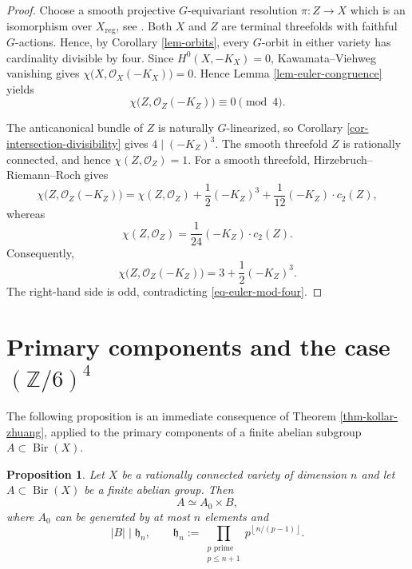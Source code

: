 \documentclass[10pt,oneside,reqno]{amsart}
\numberwithin{equation}{section}
\newtheorem{proposition}[theorem]{Proposition}
\theoremstyle{definition}
\begin{document}
\begin{proof}
Choose a smooth projective $G$-equivariant resolution
$\pi\colon Z\to X$ which is an isomorphism over $X_{\mathrm{reg}}$,
see \cite[Theorem~1.1]{BierstoneMilman}.
Both $X$ and $Z$ are terminal threefolds with faithful $G$-actions.
Hence, by Corollary \ref{lem-orbits}, every $G$-orbit in either variety
has cardinality divisible by four.
Since $H^0(X,-K_X)=0$, Kawamata--Viehweg vanishing gives
$
 \chi\bigl(X,\mathcal O_X(-K_X)\bigr)=0.
$
Hence Lemma \ref{lem-euler-congruence} yields
\begin{equation}
 \chi\bigl(Z,\mathcal O_Z(-K_Z)\bigr)\equiv0\pmod4.
 \label{eq-euler-mod-four}
\end{equation}

The anticanonical bundle of $Z$ is naturally $G$-linearized, so
Corollary \ref{cor-intersection-divisibility} gives
$
 4\mid(-K_Z)^3.
$
The smooth threefold $Z$ is rationally connected, and hence
$\chi(Z,\mathcal O_Z)=1$.  For a smooth threefold,
Hirzebruch--Riemann--Roch gives
\[
 \chi\bigl(Z,\mathcal O_Z(-K_Z)\bigr)
 =\chi(Z,\mathcal O_Z)+\frac12(-K_Z)^3
  +\frac1{12}(-K_Z)\cdot c_2(Z),
\]
whereas
\[
 \chi(Z,\mathcal O_Z)=\frac1{24}(-K_Z)\cdot c_2(Z).
\]
Consequently,
\[
 \chi\bigl(Z,\mathcal O_Z(-K_Z)\bigr)
 =3+\frac12(-K_Z)^3.
\]
The right-hand side is odd, contradicting
\eqref{eq-euler-mod-four}.
\end{proof}


\section{Primary components and the case $(\mathbb Z/6)^4$}
\label{sec-sharp-bounds}

The following proposition is an immediate consequence of Theorem
\ref{thm-kollar-zhuang}, applied to the primary components of a finite
abelian subgroup $A\subset\operatorname{Bir}(X)$.

\begin{proposition}
\label{prop-abelian-structure-general}
Let $X$ be a rationally connected variety of dimension $n$ and let
$A\subset\operatorname{Bir}(X)$ be a finite abelian group.  Then
\[
 A\simeq A_0\times B,
\]
where $A_0$ can be generated by at most $n$ elements and
\begin{equation}
 |B|\mid\mathfrak h_n,
 \qquad
 \mathfrak h_n:=
 \prod_{\substack{p\text{ prime}\\p\leq n+1}}
 p^{\left\lfloor n/(p-1)\right\rfloor}.
 \label{eq-general-bound}
\end{equation}
\end{proposition}
\end{document}

